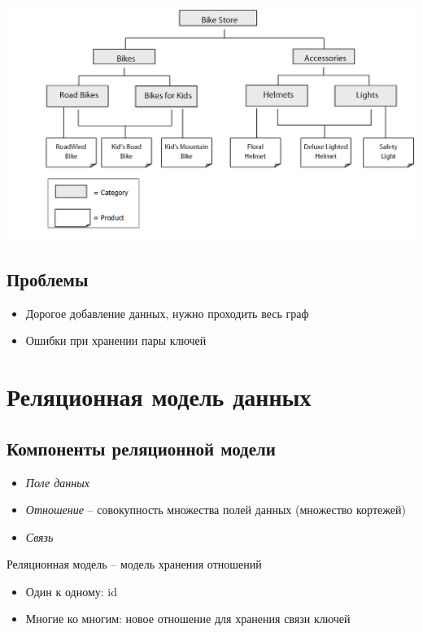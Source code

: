 \includegraphics[scale=0.8]{data/network.jpeg}

\subsection{Проблемы}

\begin{itemize}
    \item Дорогое добавление данных, нужно проходить весь граф
    \item Ошибки при хранении пары ключей
\end{itemize}

\section{Реляционная модель данных}

\subsection{Компоненты реляционной модели}

\begin{itemize}
    \item \emph{Поле данных}
    \item \emph{Отношение} -- совокупность множества полей данных (множество кортежей)
    \item \emph{Связь}
\end{itemize}

Реляционная модель -- модель хранения отношений
\begin{itemize}
    \item Один к одному: id
    \item Многие ко многим: новое отношение для хранения связи ключей
\end{itemize}


